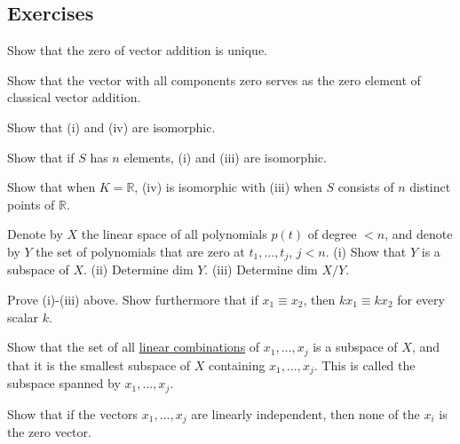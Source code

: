 \subsection{Exercises} 

  \begin{exercise}[Lax 1.1] 
    Show that the zero of vector addition is unique.
  \end{exercise}

  \begin{exercise}[Lax 1.2] 
    Show that the vector with all components zero serves as the zero element of classical vector addition.
  \end{exercise}

  \begin{exercise}[Lax 1.3] 
    Show that (i) and (iv) are isomorphic.
  \end{exercise}

  \begin{exercise}[Lax 1.4] 
    Show that if $S$ has $n$ elements, (i) and (iii) are isomorphic.
  \end{exercise}

  \begin{exercise}[Lax 1.5] 
    Show that when $K = \mathbb{R}$, (iv) is isomorphic with (iii) when $S$ consists of $n$ distinct points of $\mathbb{R}$.
  \end{exercise}

  \begin{exercise}[Lax 1.6] 
    Denote by $X$ the linear space of all polynomials $p(t)$ of degree $< n$, and denote by $Y$ the set of polynomials that are zero at $t_1,\ldots,t_j$, $j < n$.
    (i) Show that $Y$ is a subspace of $X$.
    (ii) Determine dim $Y$.
    (iii) Determine dim $X/Y$.
  \end{exercise}

  \begin{exercise}[Lax 1.7] 
    Prove (i)-(iii) above. Show furthermore that if $x_1 \equiv x_2$, then $kx_1 \equiv kx_2$ for every scalar $k$.
  \end{exercise}

  \begin{exercise}[Lax 1.9] 
    Show that the set of all \hyperref[def:linear-combination]{linear combinations} of $x_1,\ldots,x_j$ is a subspace of $X$, and that it is the smallest subspace of $X$ containing $x_1,\ldots,x_j$. This is called the subspace spanned by $x_1,\ldots,x_j$.
  \end{exercise}

  \begin{exercise}[Lax 1.10] 
    Show that if the vectors $x_1,\ldots,x_j$ are linearly independent, then none of the $x_i$ is the zero vector.
  \end{exercise}

